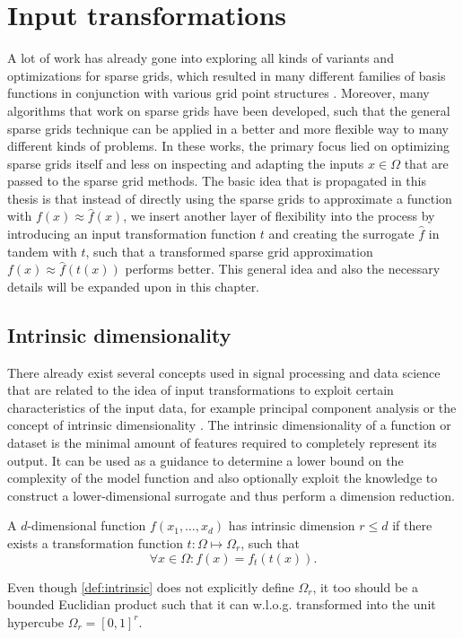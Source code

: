 \documentclass[
  a4paper,  %
  twoside,  %
  bibliography=totoc,
  headsepline,
  cleardoublepage=empty,
  parskip=half,
  draft=false
]{scrbook}
\begin{document}
\chapter{Input transformations}
\label{chap:c3}

A lot of work has already gone into exploring all kinds of variants and optimizations for sparse grids, which resulted in many different families of basis functions in conjunction with various grid point structures \cite{Valentin2019, Feuersaenger2010}.
Moreover, many algorithms that work on sparse grids \cite{Gerstner1998, Garcke2001, Pflueger2010, Valentin2019, Rehme2021} have been developed, such that the general sparse grids technique can be applied in a better and more flexible way to many different kinds of problems.
In these works, the primary focus lied on optimizing sparse grids itself and less on inspecting and adapting the inputs $x \in \Omega$ that are passed to the sparse grid methods.
The basic idea that is propagated in this thesis is that instead of directly using the sparse grids to approximate a function with $f(x) \approx \hat{f}(x)$, we insert another layer of flexibility into the process by introducing an input transformation function $t$ and creating the surrogate $\hat{f}$ in tandem with $t$, such that a transformed sparse grid approximation $f(x) \approx \hat{f}(t(x))$ performs better.
This general idea and also the necessary details will be expanded upon in this chapter.

\section{Intrinsic dimensionality}
\label{sec:intrinsic}

There already exist several concepts used in signal processing and data science that are related to the idea of input transformations to exploit certain characteristics of the input data, for example principal component analysis \cite{Abdi2010} or the concept of intrinsic dimensionality \cite{Bennett1969}.
The intrinsic dimensionality of a function or dataset is the minimal amount of features required to completely represent its output.
It can be used as a guidance to determine a lower bound on the complexity of the model function and also optionally exploit the knowledge to construct a lower-dimensional surrogate and thus perform a dimension reduction.
\begin{definition}
A $d$-dimensional function $f(x_1, \dots, x_d)$ has intrinsic dimension $r \leq d$ if there exists a transformation function $t \colon \Omega \mapsto \Omega_r$, such that
\begin{equation}
\forall x \in \Omega \colon f(x)=f_t(t(x)).
\end{equation}
\label{def:intrinsic}
\end{definition}
%
Even though \cref{def:intrinsic} does not explicitly define $\Omega_r$, it too should be a bounded Euclidian product such that it can w.l.o.g. transformed into the unit hypercube $\Omega_r=[0,1]^r$.
\end{document}
